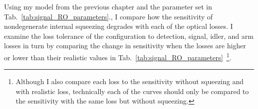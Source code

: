 Using my model from the previous chapter and the parameter set in Tab.~\ref{tab:signal_RO_parameters}., I compare how the sensitivity of nondegenerate internal squeezing degrades with each of the optical losses. %
I examine the loss tolerance of the configuration to detection, signal, idler, and arm losses in turn by comparing the change in sensitivity when the losses are higher or lower than their realistic values in Tab.~\ref{tab:signal_RO_parameters}~\footnote{Although I also compare each loss to the sensitivity without squeezing and with realistic loss, technically each of the curves should only be compared to the sensitivity with the same loss but without squeezing.}. %

